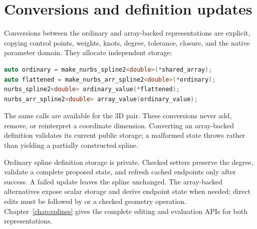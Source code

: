 \section{Conversions and definition updates}

Conversions between the ordinary and array-backed representations are
explicit, copying control points, weights, knots, degree, tolerance, closure,
and the native parameter domain. They allocate independent storage:

\begin{lstlisting}[language=C++]
auto ordinary = make_nurbs_spline2<double>(*shared_array);
auto flattened = make_nurbs_arr_spline2<double>(*ordinary);
nurbs_spline2<double> ordinary_value(*flattened);
nurbs_arr_spline2<double> array_value(ordinary_value);
\end{lstlisting}

The same calls are available for the 3D pair. These conversions never add,
remove, or reinterpret a coordinate dimension. Converting an array-backed
definition validates its current public storage; a malformed state throws
rather than yielding a partially constructed spline.

Ordinary spline definition storage is private. Checked setters preserve the
degree, validate a complete proposed state, and refresh cached endpoints only
after success. A failed update leaves the spline unchanged. The array-backed
alternatives expose scalar storage and derive endpoint state when needed;
direct edits must be followed by  or a checked geometry
operation. Chapter~\ref{chap:splines} gives the complete editing and
evaluation APIs for both representations.
